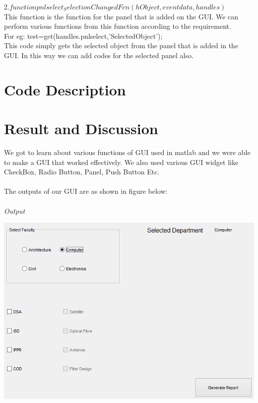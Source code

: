 \documentclass[12pt]{article}
\begin{document}
2.$function pnlselect_SelectionChangedFcn(hObject, eventdata, handles)$\\
This function is the function for the panel that is added on the GUI. We can perform various functions from this function according to the requirement.\\
For eg: test=get(handles.pnlselect,'SelectedObject');\\
This code simply gets the selected object from the panel that is added in the GUI. In this way we can add codes for the selected panel also.

\pagebreak
\section{Code Description}

\pagebreak
\section{Result and Discussion}
We got to learn about various functions of GUI used in matlab and we were able to make a GUI that worked effectively. We also used various GUI widget like CheckBox, Radio Button, Panel, Push Button Etc.\\\\
The outputs of our GUI are as shown in figure below:\\\\
\emph{Output}

\includegraphics[scale = 0.6]{output_labfour_1.png}\\
\end{document}
